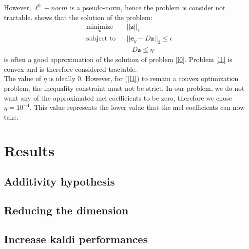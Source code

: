 \documentclass[a4paper]{report}
\newcommand{\ey}{\textbf{e}_y}
\newcommand{\zhat}{ \hat{\textbf{z}} }
\begin{document}

However, $\ell^0-norm$ is a pseudo-norm, hence the problem is consider not tractable. \cite{equivalencel1l0} shows that the solution of the problem:
\begin{equation}
  \begin{aligned}
    & \underset{\mathbf{z}}{\text{minimize}}
    & & ||\mathbf{z}||_1 \\
    & \text{subject to}
    & & ||\ey -D\mathbf{z}||_2 \leq \epsilon\\
    &&& -D\mathbf{z} \leq \eta
  \end{aligned}
\label{l1}
\end{equation}
 is often a good approximation of the solution of problem \ref{l0}. Problem \ref{l1} is convex and is therefore considered tractable.\\
The value of $\eta$ is ideally 0. However, for (\ref{l1}) to remain a convex optimization problem, the inequality constraint must not be strict. In our problem, we do not want any of the approximated mel coefficients to be zero, therefore we chose $\eta = 10^{-4}$. This value represents the lower value that the mel coefficients can now take.


\section{Results}
\subsection{Additivity hypothesis}

\subsection{Reducing the dimension}

\subsection{Increase kaldi performances}


\end{document}
